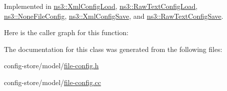 Implemented in \hyperlink{classns3_1_1XmlConfigLoad_a2037a30710dad9fc39ec0b0cc4ad6d0f}{ns3\+::\+Xml\+Config\+Load}, \hyperlink{classns3_1_1RawTextConfigLoad_ab7e3722feb39abc7fef4292a3a2aa358}{ns3\+::\+Raw\+Text\+Config\+Load}, \hyperlink{classns3_1_1NoneFileConfig_a902376f99cb6e503e5f90ce3e34f4c1d}{ns3\+::\+None\+File\+Config}, \hyperlink{classns3_1_1XmlConfigSave_a9a29b814b227311e2411e4a70ae7a714}{ns3\+::\+Xml\+Config\+Save}, and \hyperlink{classns3_1_1RawTextConfigSave_a6ea0b8b0c61abf6cf9caa3b5e3742aaa}{ns3\+::\+Raw\+Text\+Config\+Save}.



Here is the caller graph for this function\+:




The documentation for this class was generated from the following files\+:\begin{DoxyCompactItemize}
\item 
config-\/store/model/\hyperlink{file-config_8h}{file-\/config.\+h}\item 
config-\/store/model/\hyperlink{file-config_8cc}{file-\/config.\+cc}\end{DoxyCompactItemize}
